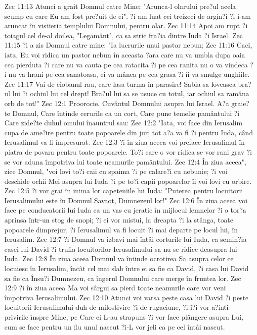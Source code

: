 Zec 11:13  Atunci a grait Domnul catre Mine: "Arunca-l olarului pre?ul acela scump cu care Eu am fost pre?uit de ei". ?i am luat cei treizeci de argin?i ?i i-am aruncat în vistieria templului Domnului, pentru olar.
Zec 11:14  Apoi am rupt ?i toiagul cel de-al doilea, "Legamânt", ca sa stric fra?ia dintre Iuda ?i Israel.
Zec 11:15  ?i a zis Domnul catre mine: "Ia lucrurile unui pastor nebun;
Zec 11:16  Caci, iata, Eu voi ridica un pastor nebun în aceasta ?ara care nu va umbla dupa oaia cea pierduta ?i care nu va cauta pe cea ratacita ?i pe cea ranita nu o va vindeca ?i nu va hrani pe cea sanatoasa, ci va mânca pe cea grasa ?i îi va smulge unghiile.
Zec 11:17  Vai de ciobanul rau, care lasa turma în parasire! Sabia sa loveasca bra?ul lui ?i ochiul lui cel drept! Bra?ul lui sa se usuce cu totul, iar ochiul sa ramâna orb de tot!"
Zec 12:1  Proorocie. Cuvântul Domnului asupra lui Israel. A?a graie?te Domnul, Care întinde cerurile ca un cort, Care pune temelie pamântului ?i Care zide?te duhul omului înauntrul sau:
Zec 12:2  "Iata, voi face din Ierusalim cupa de ame?ire pentru toate popoarele din jur; tot a?a va fi ?i pentru Iuda, când Ierusalimul va fi împresurat.
Zec 12:3  ?i în ziua aceea voi preface Ierusalimul în piatra de povara pentru toate popoarele. To?i care o vor ridica se vor rani grav ?i se vor aduna împotriva lui toate neamurile pamântului.
Zec 12:4  În ziua aceea", zice Domnul, "voi lovi to?i caii cu spaima ?i pe calare?i cu nebunie; ?i voi deschide ochii Mei asupra lui Iuda ?i pe to?i capii popoarelor îi voi lovi cu orbire.
Zec 12:5  ?i vor grai în inima lor capeteniile lui Iuda: "Puterea pentru locuitorii Ierusalimului este în Domnul Savaot, Dumnezeul lor!"
Zec 12:6  În ziua aceea voi face pe conducatorii lui Iuda ca un vas cu jeratic în mijlocul lemnelor ?i o tor?a aprinsa într-un stog de snopi; ?i ei vor mistui, la dreapta ?i la stânga, toate popoarele dimprejur, ?i Ierusalimul va fi locuit ?i mai departe pe locul lui, în Ierusalim.
Zec 12:7  ?i Domnul va izbavi mai întâi corturile lui Iuda, ca semin?ia casei lui David ?i trufia locuitorilor Ierusalimului sa nu se ridice deasupra lui Iuda.
Zec 12:8  În ziua aceea Domnul va întinde ocrotirea Sa asupra celor ce locuiesc în Ierusalim, încât cel mai slab între ei sa fie ca David, ?i casa lui David sa fie ca Însu?i Dumnezeu, ca îngerul Domnului care merge în fruntea lor.
Zec 12:9  ?i în ziua aceea Ma voi sârgui sa pierd toate neamurile care vor veni împotriva Ierusalimului.
Zec 12:10  Atunci voi varsa peste casa lui David ?i peste locuitorii Ierusalimului duh de milostivire ?i de rugaciune, ?i î?i vor a?inti privirile înspre Mine, pe Care ei L-au strapuns ?i vor face plângere asupra Lui, cum se face pentru un fiu unul nascut ?i-L vor jeli ca pe cel întâi nascut.
